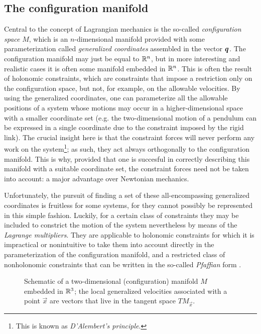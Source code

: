 \subsection{The configuration manifold}
Central to the concept of Lagrangian mechanics is the so-called \emph{configuration space} \(M\), which is an \(n\)-dimensional manifold provided with some parameterization called \emph{generalized coordinates} assembled in the vector \(\vb*{q}\). 
The configuration manifold may just be equal to \(\mathbb{R}^n\), but in more interesting and realistic cases it is often some manifold embedded in \(\mathbb{R}^n\). This is often the result of holonomic constraints, which are constraints that impose a restriction only on the configuration space, but not, for example, on the allowable velocities.
By using the generalized coordinates, one can parameterize all the allowable positions of a system whose motions may occur in a higher-dimensional space with a smaller coordinate set (e.g. the two-dimensional motion of a pendulum can be expressed in a single coordinate due to the constraint imposed by the rigid link).  The crucial insight here is that the constraint forces will never perform any work on the system\footnote{This is known as \emph{D'Alembert's principle}.}; as such, they act always orthogonally to the configuration manifold. This is why, provided that one is succesful in correctly describing this manifold with a suitable coordinate set, the constraint forces need not be taken into account: a  major advantage over Newtonian mechanics. 

Unfortunately, the pursuit of finding a set of these all-encompassing generalized coordinates is fruitless for some systems, for they cannot possibly be represented in this simple fashion. Luckily, for a certain class of constraints they may be included to constrict the motion of the system nevertheless by means of the \emph{Lagrange multipliers}. They are applicable to holonomic constraints for which it is impractical or nonintuitive to take them into account directly in the parameterization of the configuration manifold, and a restricted class of nonholonomic constraints that can be written in the so-called \emph{Pfaffian} form \cite{Bullo2005}.

\begin{figure}[ht]
    \centering
    
    \caption{Schematic of a two-dimensional (configuration) manifold $M$ embedded in $\mathbb{R}^3$; the local generalized velocities associated with a point $\vec{x}$ are vectors that live in the tangent space $TM_{\vec{x}}$.}
    \label{fig:conf_mnfold}
\end{figure}

